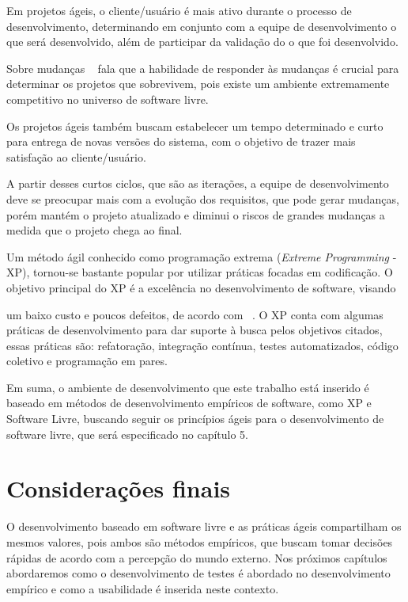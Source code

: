 Em projetos ágeis, o cliente/usuário é mais ativo durante o processo de desenvolvimento, determinando em conjunto com a equipe de desenvolvimento o que será desenvolvido, além de participar da validação do o que foi desenvolvido.

Sobre mudanças ~ fala que a habilidade de responder às mudanças é crucial para determinar os projetos que sobrevivem, pois existe um ambiente extremamente competitivo no universo de software livre.

Os projetos ágeis também buscam estabelecer um tempo determinado e curto para entrega de novas versões do sistema, com o objetivo de trazer mais satisfação ao cliente/usuário.

A partir desses curtos ciclos, que são as iterações, a equipe de desenvolvimento 
deve se preocupar mais com a evolução dos requisitos, que pode gerar mudanças, porém 
mantém o projeto atualizado e diminui o riscos de grandes mudanças a medida que o 
projeto chega ao final.

Um método ágil conhecido como programação extrema (\emph{Extreme Programming} - XP), 
tornou-se bastante popular por utilizar práticas focadas em codificação.
%
O objetivo principal do XP é a excelência no desenvolvimento de software, visando 

um baixo custo e poucos defeitos, de acordo com ~. O XP conta com algumas práticas de desenvolvimento para dar suporte à busca pelos objetivos citados, essas práticas são: refatoração, integração contínua, testes automatizados, código coletivo e programação em pares.

Em suma, o ambiente de desenvolvimento que este trabalho está inserido é baseado em métodos de desenvolvimento empíricos de software, como XP e Software Livre, buscando seguir os princípios ágeis para o desenvolvimento de software livre, que será especificado no capítulo 5.


\section{Considerações finais}

O desenvolvimento baseado em software livre e as práticas ágeis compartilham os mesmos valores, pois ambos são métodos empíricos, que buscam tomar decisões rápidas de acordo com a percepção do mundo externo. Nos próximos capítulos abordaremos como o desenvolvimento de testes é abordado no desenvolvimento empírico e como a usabilidade é inserida neste contexto.


